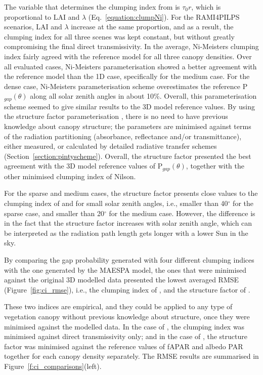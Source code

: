 The variable that determines the clumping index from \citet{Ni-Meister2010} is $\tau_0r$, which is proportional to LAI and $\lambda$ (Eq.~\ref{equation:clumpNi}). For the RAMI4PILPS scenarios, LAI and $\lambda$ increase at the same proportion, and as a result, the clumping index for all three scenes was kept constant, but without greatly compromising the final direct transmissivity. In the average, Ni-Meister\textsinglequote s clumping index fairly agreed with the reference model for all three canopy densities. Over all evaluated cases, Ni-Meister\textquotesingle s parameterisation showed a better agreement with the reference model than the 1D case, specifically for the medium case. For the dense case, Ni-Meister\textquotesingle s parameterisation scheme overestimates the reference P$_{gap}(\theta)$ along all solar zenith angles in about 10\%. Overall, this parameterisation scheme seemed to give similar results to the 3D model reference values. By using the structure factor parameterisation \citep{pinty2006}, there is no need to have previous knowledge about canopy structure; the parameters are minimised against terms of the radiation partitioning (absorbance, reflectance and/or transmittance), either measured, or calculated by detailed radiative transfer schemes (Section~\ref{section:pintyscheme}). Overall, the structure factor presented the best agreement with the 3D model reference values of P$_{gap}(\theta)$, together with the other minimised clumping index of Nilson.

For the sparse and medium cases, the structure factor presents close values to the clumping index of \citet{Nilson1971} and \citet{Ni-Meister2010} for small solar zenith angles, i.e., smaller than 40$^{\circ}$ for the sparse case, and smaller than 20$^{\circ}$ for the medium case. However, the difference is in the fact that the structure factor increases with solar zenith angle, which can be interpreted as the radiation path length gets longer with a lower Sun in the sky.

By comparing the gap probability generated with four different clumping indices with the one generated by the MAESPA model, the ones that were minimised against the original 3D modelled data presented the lowest averaged RMSE (Figure~\ref{fig:ci_rmse}), i.e., the clumping index of \citet{Nilson1971}, and the structure factor of \citet{pinty2006}. 

These two indices are empirical, and they could be applied to any type of vegetation canopy without previous knowledge about structure, once they were minimised against the modelled data. In the case of \citet{Nilson1971}, the clumping index was minimised against direct transmissivity only; and in the case of \citet{pinty2006}, the structure factor was minimised against the reference values of fAPAR and albedo PAR together for each canopy density separately. The RMSE results are summarised in Figure~\ref{f:ci_comparisons}(left).

